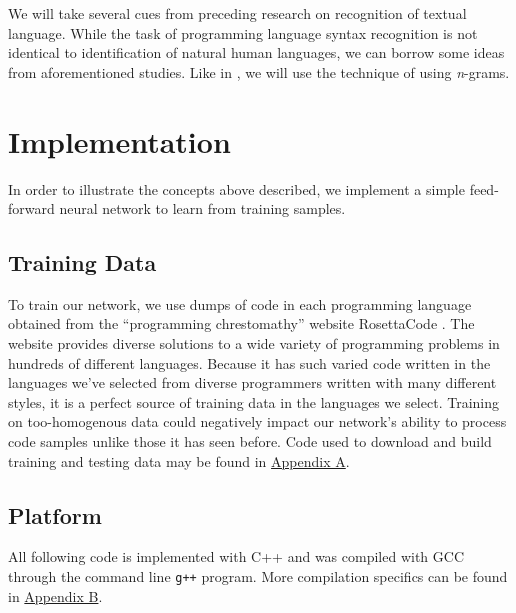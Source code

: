\documentclass{article}
\begin{document}
We will take several cues from preceding research on recognition of textual language. While the task of programming language syntax recognition is not identical to identification of natural human languages, we can borrow some ideas from aforementioned studies. Like in \cite{langidstanford}, we will use the technique of using \textit{n}-grams.

\section{Implementation}
In order to illustrate the concepts above described, we implement a simple feed-forward neural network to learn from training samples.

\subsection{Training Data}
To train our network, we use dumps of code in each programming language obtained from the ``programming chrestomathy'' website RosettaCode \cite{rosettacode}. The website provides diverse solutions to a wide variety of programming problems in hundreds of different languages. Because it has such varied code written in the languages we've selected from diverse programmers written with many different styles, it is a perfect source of training data in the languages we select. Training on too-homogenous data could negatively impact our network's ability to process code samples unlike those it has seen before. Code used to download and build training and testing data may be found in  \hyperref[sec:appendix_a]{Appendix A}.
\subsection{Platform}
All following code is implemented with C++ and was compiled with GCC through the command line \texttt{g++} program. More compilation specifics can be found in \hyperref[sec:appendix_b]{Appendix B}.
\end{document}

